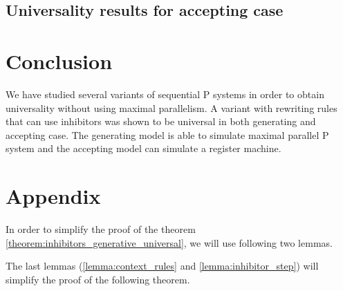 \documentclass[llncs,submission,copyright,creativecommons]{../lib/lncs/llncs}
\begin{document}

\subsection{Universality results for accepting case} %
\label{sub:universality_results_for_accepting_case}




\section{Conclusion}
\label{sec:conclusion}
We have studied several variants of sequential P systems in order to obtain universality without using maximal parallelism.
A variant with rewriting rules that can use inhibitors was shown to be universal in both generating and accepting case. The generating model is able to simulate maximal parallel P system and the accepting model can simulate a register machine.


\section{Appendix} %
\label{sec:appendix}

In order to simplify the proof of the theorem \ref{theorem:inhibitors_generative_universal}, we will use following two lemmas.


The last lemmas (\ref{lemma:context_rules} and \ref{lemma:inhibitor_step}) will simplify the proof of the following theorem.


\end{document}
